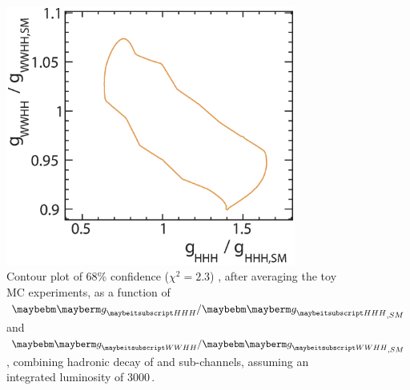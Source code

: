 \begin{figure}[!htbp]
    \includegraphics[width=0.85\textwidth]{doubleHiggs/extraction/new/contourCOmbineAve3}
\caption{Contour plot of 68\% confidence ($\chi^2 = 2.3$) , after averaging the toy MC experiments, as a function of $\gHHH/\gHHH_{,SM}$ and  $\gWWHH/\gWWHH_{,SM}$,  combining hadronic \WW  decay of \eeToHHbbWW and \eeToHHbbbb sub-channels, assuming an integrated luminosity of  3000\,.}
   \label{fig:doubleHiggsCouplingChi2Countour}
\end{figure} 